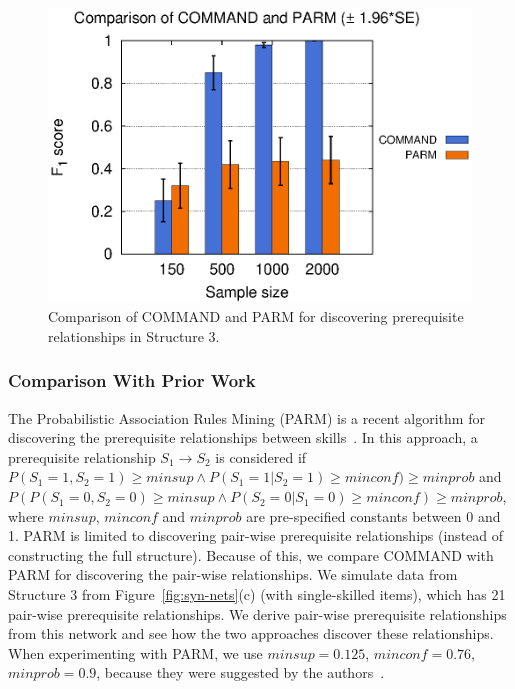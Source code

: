 \documentclass{edm_template}
\begin{document}
			\begin{figure}[ht]
						\begin{center}
							\centering
							\includegraphics[width=0.55\linewidth]{figures/F1_parm.eps}
						\end{center}
						\vspace{-1em}
						\caption{Comparison of COMMAND and PARM for discovering prerequisite relationships in Structure 3. %
						}
						\label{fig:f1-parm}
						\vspace{-1em} 
					\end{figure} 				
	\subsubsection{Comparison With Prior Work}
	The Probabilistic Association Rules Mining (PARM) is a recent algorithm for discovering the prerequisite relationships between skills~\cite{chen2015discovering}.
	In this approach, a prerequisite relationship $S_1\rightarrow S_2$ is considered if
	$P(S_1=1,S_2=1) \ge minsup \wedge P(S_1=1|S_2=1)\ge minconf) \ge minprob$ and $P(P(S_1=0,S_2=0) \ge minsup \wedge P(S_2=0|S_1=0)\ge minconf) \ge minprob$, 
	where $minsup$, $minconf$ and $minprob$ are pre-specified constants between 0 and 1.
	PARM is limited to discovering pair-wise prerequisite relationships (instead of constructing the full structure).
	Because of this, we compare COMMAND with PARM for discovering the pair-wise relationships.
	We simulate data from Structure 3 from Figure~\ref{fig:syn-nets}(c) (with single-skilled items), which has 21 pair-wise prerequisite relationships.
	We derive pair-wise prerequisite relationships from this network  and see how the two approaches discover these relationships.
	When experimenting with PARM, we use $ minsup=0.125$, $minconf=0.76$, $minprob=0.9$, because they were suggested by the authors~\cite{chen2015discovering}.
	
\end{document}
